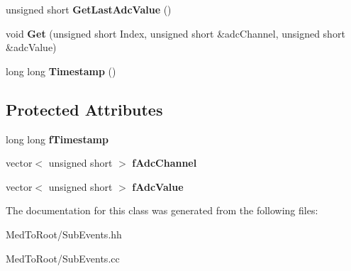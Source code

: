 \begin{DoxyCompactItemize}
\item 
\hypertarget{class_adc_sub_event_a14dcc9cc0d97fef0b80303ac7776019c}{unsigned short {\bfseries Get\-Last\-Adc\-Value} ()}\label{class_adc_sub_event_a14dcc9cc0d97fef0b80303ac7776019c}

\item 
\hypertarget{class_adc_sub_event_ac49b638c7d81d251300a7d65a9c33e11}{void {\bfseries Get} (unsigned short Index, unsigned short \&adc\-Channel, unsigned short \&adc\-Value)}\label{class_adc_sub_event_ac49b638c7d81d251300a7d65a9c33e11}

\item 
\hypertarget{class_adc_sub_event_ab76f954140f4aea1baac5bc2a109f558}{long long {\bfseries Timestamp} ()}\label{class_adc_sub_event_ab76f954140f4aea1baac5bc2a109f558}

\end{DoxyCompactItemize}
\subsection*{Protected Attributes}
\begin{DoxyCompactItemize}
\item 
\hypertarget{class_adc_sub_event_a4da7e5aa53af126234c81cbcf64cfd85}{long long {\bfseries f\-Timestamp}}\label{class_adc_sub_event_a4da7e5aa53af126234c81cbcf64cfd85}

\item 
\hypertarget{class_adc_sub_event_a27eefd5215bc0d882b277d627c33436d}{vector$<$ unsigned short $>$ {\bfseries f\-Adc\-Channel}}\label{class_adc_sub_event_a27eefd5215bc0d882b277d627c33436d}

\item 
\hypertarget{class_adc_sub_event_a0c779d8072a161c53e3b3ac57d41a25a}{vector$<$ unsigned short $>$ {\bfseries f\-Adc\-Value}}\label{class_adc_sub_event_a0c779d8072a161c53e3b3ac57d41a25a}

\end{DoxyCompactItemize}


The documentation for this class was generated from the following files\-:\begin{DoxyCompactItemize}
\item 
Med\-To\-Root/Sub\-Events.\-hh\item 
Med\-To\-Root/Sub\-Events.\-cc\end{DoxyCompactItemize}
